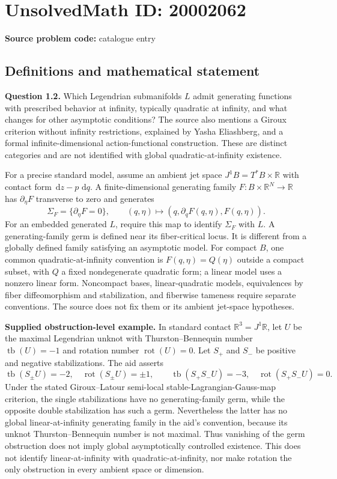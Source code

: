 \documentclass[11pt]{article}
\newcommand{\R}{\mathbb{R}}
\newcommand{\dd}{\,\mathrm{d}}
\begin{document}
\section*{UnsolvedMath ID: 20002062}
\textbf{Source problem code:} catalogue entry
\subsection{Definitions and mathematical statement}
\textbf{Question 1.2.} Which Legendrian submanifolds $L$ admit generating functions with prescribed behavior at infinity, typically quadratic at infinity, and what changes for other asymptotic conditions? The source also mentions a Giroux criterion without infinity restrictions, explained by Yasha Eliashberg, and a formal infinite-dimensional action-functional construction. These are distinct categories and are not identified with global quadratic-at-infinity existence.

For a precise standard model, assume an ambient jet space $J^1B=T^*B\times\R$ with contact form $\dd z-p\,\dd q$. A finite-dimensional generating family $F:B\times\R^N\to\R$ has $\partial_\eta F$ transverse to zero and generates
\[
 \Sigma_F=\{\partial_\eta F=0\},\qquad
 (q,\eta)\longmapsto(q,\partial_qF(q,\eta),F(q,\eta)).
\]
For an embedded generated $L$, require this map to identify $\Sigma_F$ with $L$. A generating-family germ is defined near its fiber-critical locus. It is different from a globally defined family satisfying an asymptotic model. For compact $B$, one common quadratic-at-infinity convention is $F(q,\eta)=Q(\eta)$ outside a compact subset, with $Q$ a fixed nondegenerate quadratic form; a linear model uses a nonzero linear form. Noncompact bases, linear-quadratic models, equivalences by fiber diffeomorphism and stabilization, and fiberwise tameness require separate conventions. The source does not fix them or its ambient jet-space hypotheses.

\textbf{Supplied obstruction-level example.} In standard contact $\R^3=J^1\R$, let $U$ be the maximal Legendrian unknot with Thurston--Bennequin number $\operatorname{tb}(U)=-1$ and rotation number $\operatorname{rot}(U)=0$. Let $S_+$ and $S_-$ be positive and negative stabilizations. The aid asserts
\[
 \operatorname{tb}(S_\pm U)=-2,\quad
 \operatorname{rot}(S_\pm U)=\pm1,
 \qquad
 \operatorname{tb}(S_+S_-U)=-3,\quad
 \operatorname{rot}(S_+S_-U)=0.
\]
Under the stated Giroux--Latour semi-local stable-Lagrangian-Gauss-map criterion, the single stabilizations have no generating-family germ, while the opposite double stabilization has such a germ. Nevertheless the latter has no global linear-at-infinity generating family in the aid's convention, because its unknot Thurston--Bennequin number is not maximal. Thus vanishing of the germ obstruction does not imply global asymptotically controlled existence. This does not identify linear-at-infinity with quadratic-at-infinity, nor make rotation the only obstruction in every ambient space or dimension.
\end{document}
